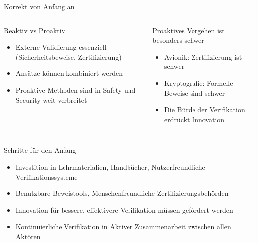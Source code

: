 \begin{frame}{Korrekt von Anfang an}
  \begin{columns}[t,fullwidth]
    \begin{column}{.3\linewidth}
      Reaktiv vs Proaktiv
      \tiny
      \vspace{0.5em}
      \begin{itemize}
        \item Externe Validierung essenziell (Sicherheitsbeweise, Zertifizierung)
        \item Ansätze können kombiniert werden
        \item Proaktive Methoden sind in Safety und Security weit verbreitet
      \end{itemize}
    \end{column}

    \vrule

    \begin{column}{.65\linewidth}
      Proaktives Vorgehen ist besonders schwer
      \tiny
      \vspace{0.5em}
      \begin{itemize}
        \item Avionik: Zertifizierung ist schwer
        \item Kryptografie: Formelle Beweise sind schwer
        \item Die Bürde der Verifikation erdrückt Innovation
      \end{itemize}
    \end{column}

  \end{columns}

  \hrule

  Schritte für den Anfang

  \tiny
  \begin{itemize}
    \item Investition in Lehrmaterialien, Handbücher, Nutzerfreundliche Verifikationssysteme
    \item Benutzbare Beweistools, Menschenfreundliche Zertifizierungsbehörden
    \item Innovation für bessere, effektivere Verifikation müssen gefördert werden
    \item Kontinuierliche Verifikation in Aktiver Zusammenarbeit zwischen allen Aktören
  \end{itemize}
\end{frame}


